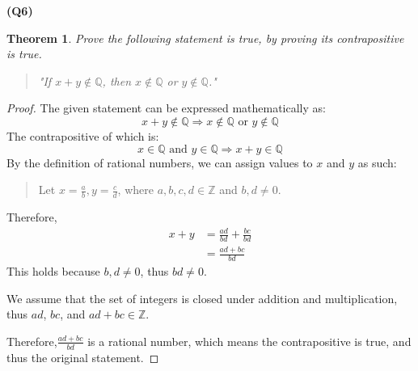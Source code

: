 \documentclass[12pt, a4paper]{article}
\newcommand{\Q}{\mathbb{Q}}
\newcommand{\Z}{\mathbb{Z}}
\newtheorem{theorem}{Theorem}
\begin{document}
\textbf{(Q6)}
\begin{theorem}
    Prove the following statement is true, by proving its contrapositive is true.
    \begin{quote}
        "If $x+y \notin \Q$, then $x \notin \Q$ or $y \notin \Q$."
    \end{quote}
\end{theorem}

\begin{proof}
    The given statement can be expressed mathematically as:
    \[
        x + y \notin \Q \Rightarrow x \notin \Q \text{ or } y \notin \Q
    \]
    The contrapositive of which is:
    \[
        x \in \Q \text{ and } y \in \Q \Rightarrow x + y \in \Q
    \]
    By the definition of rational numbers, we can assign values to $x$ and $y$ as such:
    \begin{quote}
        Let $x = \tfrac{a}{b}, y = \tfrac{c}{d}$, where $a,b,c,d \in \Z$ and $b,d \neq 0$.
    \end{quote}
    Therefore,
    \begin{align*}
        x + y & = \frac{ad}{bd} + \frac{bc}{bd}\\
        & = \frac{ad + bc}{bd}
    \end{align*}
    This holds because $b,d \neq 0$, thus $bd \neq 0$.

    We assume that the set of integers is closed under addition and multiplication,
    thus $ad$, $bc$, and $ad + bc \in \Z$.

    Therefore,$\tfrac{ad + bc}{bd}$ is a rational number, which means the contrapositive is true,
    and thus the original statement.
\end{proof}
\end{document}
